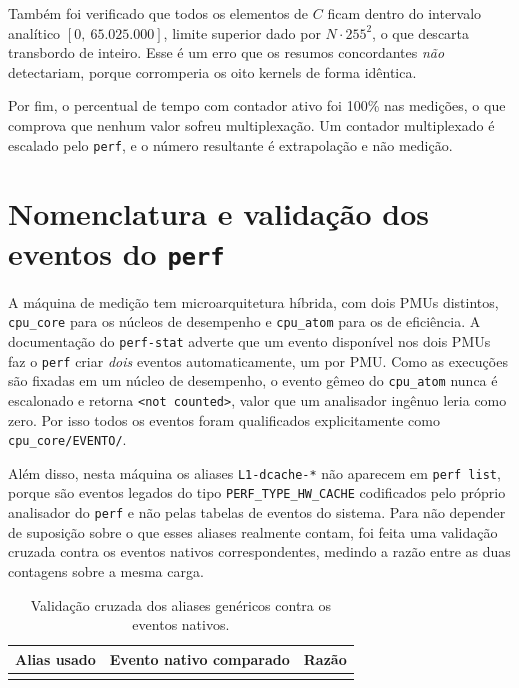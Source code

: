 \documentclass[11pt,a4paper]{article}
\begin{document}
Também foi verificado que todos os elementos de $C$ ficam dentro do intervalo analítico
$[0,\ 65.025.000]$, limite superior dado por $N \cdot 255^2$, o que descarta transbordo
de inteiro. Esse é um erro que os resumos concordantes \emph{não} detectariam, porque
corromperia os oito kernels de forma idêntica.

Por fim, o percentual de tempo com contador ativo foi 100\% nas \valMedicoes{} medições,
o que comprova que nenhum valor sofreu multiplexação. Um contador multiplexado é escalado
pelo \texttt{perf}, e o número resultante é extrapolação e não medição.


\section{Nomenclatura e validação dos eventos do \texttt{perf}}
\label{ap:eventos}

A máquina de medição tem microarquitetura híbrida, com dois PMUs distintos,
\texttt{cpu\_core} para os núcleos de desempenho e \texttt{cpu\_atom} para os de
eficiência. A documentação do \texttt{perf-stat} adverte que um evento disponível nos dois
PMUs faz o \texttt{perf} criar \emph{dois} eventos automaticamente, um por PMU. Como as
execuções são fixadas em um núcleo de desempenho, o evento gêmeo do \texttt{cpu\_atom}
nunca é escalonado e retorna \texttt{<not counted>}, valor que um analisador ingênuo leria
como zero. Por isso todos os eventos foram qualificados explicitamente como
\texttt{cpu\_core/EVENTO/}.

Além disso, nesta máquina os aliases \texttt{L1-dcache-*} não aparecem em
\texttt{perf list}, porque são eventos legados do tipo \texttt{PERF\_TYPE\_HW\_CACHE}
codificados pelo próprio analisador do \texttt{perf} e não pelas tabelas de eventos do
sistema. Para não depender de suposição sobre o que esses aliases realmente contam, foi
feita uma validação cruzada contra os eventos nativos correspondentes, medindo a razão
entre as duas contagens sobre a mesma carga.

\begin{table}[H]
\centering
\caption{Validação cruzada dos aliases genéricos contra os eventos nativos.}
\label{tab:eventos}
\small
\begin{tabular}{@{}llc@{}}
\toprule
\textbf{Alias usado} & \textbf{Evento nativo comparado} & \textbf{Razão} \\
\midrule
\\
\bottomrule
\end{tabular}
\end{table}
\end{document}

